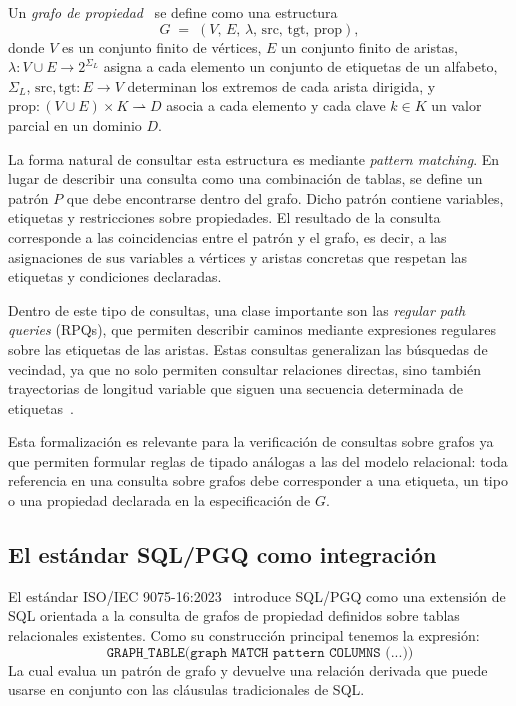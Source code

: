 Un \emph{grafo de propiedad}~\cite{Angles2017Graph} se define como una estructura
\[
G \;=\; (V,\, E,\, \lambda,\, \mathrm{src},\, \mathrm{tgt},\, \mathrm{prop}),
\]
donde $V$ es un conjunto finito de vértices, $E$ un conjunto finito de aristas, $\lambda: V \cup E \to 2^{\Sigma_L}$ asigna a cada elemento un conjunto de etiquetas de un alfabeto, $\Sigma_L$, $\mathrm{src}, \mathrm{tgt}: E \to V$ determinan los extremos de cada arista dirigida, y $\mathrm{prop}: (V \cup E) \times K \rightharpoonup D$ asocia a cada elemento y cada clave $k \in K$ un valor parcial en un dominio $D$.

La forma natural de consultar esta estructura es mediante \emph{pattern matching}. En lugar de describir una consulta como una combinación de tablas, se define un patrón $P$ que debe encontrarse dentro del grafo. Dicho patrón contiene variables, etiquetas y restricciones sobre propiedades. El resultado de la consulta corresponde a las coincidencias entre el patrón y el grafo, es decir, a las asignaciones de sus variables a vértices y aristas concretas que respetan las etiquetas y condiciones declaradas.

Dentro de este tipo de consultas, una clase importante son las \emph{regular path queries} (\acp{RPQ}), que permiten describir caminos mediante expresiones regulares sobre las etiquetas de las aristas. Estas consultas generalizan las búsquedas de vecindad, ya que no solo permiten consultar relaciones directas, sino también trayectorias de longitud variable que siguen una secuencia determinada de etiquetas~\cite{Angles2017Graph}.

Esta formalización es relevante para la verificación de consultas sobre grafos ya que permiten formular reglas de tipado análogas a las del modelo relacional: toda referencia en una consulta sobre grafos debe corresponder a una etiqueta, un tipo o una propiedad declarada en la especificación de $G$.

\subsection{El estándar SQL/PGQ como integración}

El estándar ISO/IEC 9075-16:2023~\cite{ISO9075_16_2023} introduce \ac{SQL}/\ac{PGQ} como una extensión de SQL orientada a la consulta de grafos de propiedad definidos sobre tablas relacionales existentes. Como su construcción principal tenemos la expresión:
\[ \texttt{GRAPH\_TABLE(graph MATCH pattern COLUMNS (...))} \]
La cual evalua un patrón de grafo y devuelve una relación derivada que puede usarse en conjunto con las cláusulas tradicionales de SQL. 

